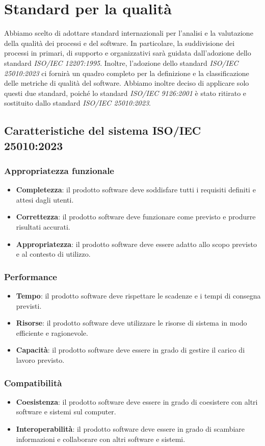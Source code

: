 \section{Standard per la qualità}
Abbiamo scelto di adottare standard internazionali per l'analisi e la valutazione della qualità dei processi e del software. In particolare, la suddivisione dei processi in primari, di supporto e organizzativi sarà guidata dall'adozione dello standard \textit{ISO/IEC 12207:1995}. Inoltre, l'adozione dello standard \textit{ISO/IEC 25010:2023} ci fornirà un quadro completo per la definizione e la classificazione delle metriche di qualità del software. Abbiamo inoltre deciso di applicare solo questi due standard, poiché lo standard \textit{ISO/IEC 9126:2001} è stato ritirato e sostituito dallo standard \textit{ISO/IEC 25010:2023}.
\subsection{Caratteristiche del sistema ISO/IEC 25010:2023}
\subsubsection{Appropriatezza funzionale}
\begin{itemize}
    \item \textbf{Completezza}: il prodotto software deve soddisfare tutti i requisiti definiti e attesi dagli utenti.
    \item \textbf{Correttezza}: il prodotto software deve funzionare come previsto e produrre risultati accurati.
    \item \textbf{Appropriatezza}: il prodotto software deve essere adatto allo scopo previsto e al contesto di utilizzo.
\end{itemize}
\subsubsection{Performance}
\begin{itemize}
    \item \textbf{Tempo}: il prodotto software deve rispettare le scadenze e i tempi di consegna previsti.
    \item \textbf{Risorse}: il prodotto software deve utilizzare le risorse di sistema in modo efficiente e ragionevole.
    \item \textbf{Capacità}: il prodotto software deve essere in grado di gestire il carico di lavoro previsto.
\end{itemize}
\subsubsection{Compatibilità}
\begin{itemize}
    \item \textbf{Coesistenza}: il prodotto software deve essere in grado di coesistere con altri software e sistemi sul computer.
    \item \textbf{Interoperabilità}: il prodotto software deve essere in grado di scambiare informazioni e collaborare con altri software e sistemi.
\end{itemize}
